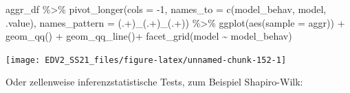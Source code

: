 \documentclass[
]{book}
\newenvironment{Shaded}{\begin{snugshade}}{\end{snugshade}}
\newcommand{\AttributeTok}[1]{\textcolor[rgb]{0.77,0.63,0.00}{#1}}
\newcommand{\DecValTok}[1]{\textcolor[rgb]{0.00,0.00,0.81}{#1}}
\newcommand{\FunctionTok}[1]{\textcolor[rgb]{0.00,0.00,0.00}{#1}}
\newcommand{\NormalTok}[1]{#1}
\newcommand{\OtherTok}[1]{\textcolor[rgb]{0.56,0.35,0.01}{#1}}
\newcommand{\SpecialCharTok}[1]{\textcolor[rgb]{0.00,0.00,0.00}{#1}}
\newcommand{\StringTok}[1]{\textcolor[rgb]{0.31,0.60,0.02}{#1}}
\begin{document}
\begin{Shaded}
\begin{Highlighting}[]
\NormalTok{aggr\_df }\SpecialCharTok{\%\textgreater{}\%} 
  \FunctionTok{pivot\_longer}\NormalTok{(}\AttributeTok{cols =} \SpecialCharTok{{-}}\DecValTok{1}\NormalTok{,}
               \AttributeTok{names\_to =} \FunctionTok{c}\NormalTok{(}\StringTok{\textquotesingle{}model\_behav\textquotesingle{}}\NormalTok{, }\StringTok{\textquotesingle{}model\textquotesingle{}}\NormalTok{, }\StringTok{\textquotesingle{}.value\textquotesingle{}}\NormalTok{),}
               \AttributeTok{names\_pattern =} \StringTok{\textquotesingle{}(.+)\_(.+)\_(.+)\textquotesingle{}}\NormalTok{) }\SpecialCharTok{\%\textgreater{}\%}  
  \FunctionTok{ggplot}\NormalTok{(}\FunctionTok{aes}\NormalTok{(}\AttributeTok{sample =}\NormalTok{ aggr)) }\SpecialCharTok{+}
  \FunctionTok{geom\_qq}\NormalTok{() }\SpecialCharTok{+}
  \FunctionTok{geom\_qq\_line}\NormalTok{()}\SpecialCharTok{+}
  \FunctionTok{facet\_grid}\NormalTok{(model }\SpecialCharTok{\textasciitilde{}}\NormalTok{ model\_behav) }
\end{Highlighting}
\end{Shaded}

\begin{center}\texttt{[image: EDV2\_SS21\_files/figure-latex/unnamed-chunk-152-1]} \end{center}

Oder zellenweise inferenzstatistische Tests, zum Beispiel Shapiro-Wilk:

\begin{Shaded}
\end{Shaded}
\end{document}
